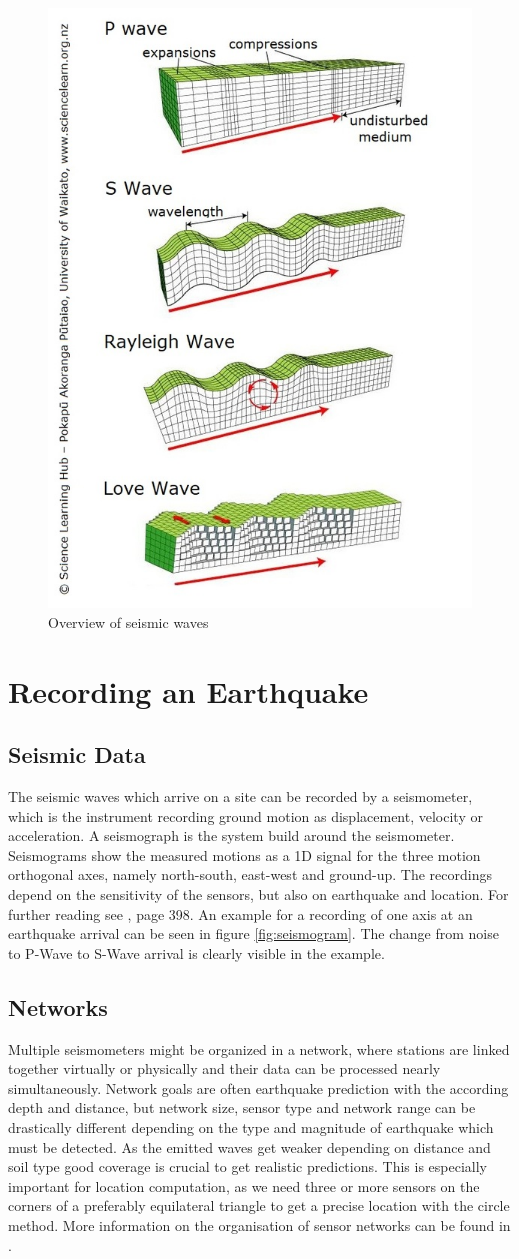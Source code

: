 \documentclass[thesis.tex]{subfiles}
\begin{document}
\begin{figure}[h!]
	\centering
	\includegraphics[width=0.6\linewidth]{../pictures/Prerequisites/waves.jpg}
	\caption{Overview of seismic waves}
	\label{fig:waves}
\end{figure}
\section{Recording an Earthquake}
\subsection{Seismic Data}
The seismic waves which arrive on a site can be recorded by a seismometer, which is the instrument recording ground motion as displacement, velocity or acceleration. A seismograph is the system build around the seismometer. Seismograms show the measured motions as a 1D signal for the three motion orthogonal axes, namely north-south, east-west and ground-up. The recordings depend on the sensitivity of the sensors, but also on earthquake and location. For further reading see \citet{IntroEarthquakes}, page 398. An example for a recording of one axis at an earthquake arrival can be seen in figure \ref{fig:seismogram}. The change from noise to P-Wave to S-Wave arrival is clearly visible in the example. 
\subsection{Networks}
Multiple seismometers might be organized in a network, where stations are linked together virtually or physically and their data can be processed nearly simultaneously. Network goals are often earthquake prediction with the according depth and distance, but network size, sensor type and network range can be drastically different depending on the type and magnitude of earthquake which must be detected. As the emitted waves get weaker depending on distance and soil type good coverage is crucial to get realistic predictions. This is especially important for location computation, as we need three or more sensors on the corners of a preferably equilateral triangle to get a precise location with the circle method. More information on the organisation of sensor networks can be found in \cite{Havskov2016}.
\end{document}
